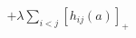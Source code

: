\documentclass[preview]{standalone}
\begin{document}
\begin{align*}
+\lambda\sum_{i<j} [h_{ij}(a)]_+
\end{align*}
\end{document}
